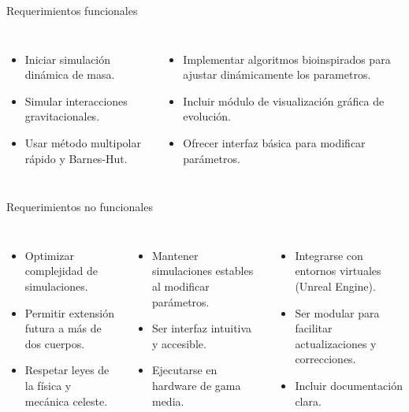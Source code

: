 \begin{frame}{Requerimientos funcionales}
  \begin{columns}[T]
      \begin{itemize}
        \item Iniciar simulación dinámica de masa.
        \item Simular interacciones gravitacionales.
        \item Usar método multipolar rápido y Barnes-Hut.
      \end{itemize}
      \begin{itemize}
        \item Implementar algoritmos bioinspirados para ajustar dinámicamente los parametros.
        \item Incluir módulo de visualización gráfica de evolución.
        \item Ofrecer interfaz básica para modificar parámetros.
      \end{itemize}
  \end{columns}
\end{frame}

\begin{frame}{Requerimientos no funcionales}
  \begin{columns}[T]
      \begin{itemize}
        \item Optimizar complejidad de simulaciones.
        \item Permitir extensión futura a más de dos cuerpos.
        \item Respetar leyes de la física y mecánica celeste.
      \end{itemize}
      \begin{itemize}
        \item Mantener simulaciones estables al modificar parámetros.
        \item Ser interfaz intuitiva y accesible.
        \item Ejecutarse en hardware de gama media.
      \end{itemize}
      \begin{itemize}
        \item Integrarse con entornos virtuales (Unreal Engine).
        \item Ser modular para facilitar actualizaciones y correcciones.
        \item Incluir documentación clara.
      \end{itemize}
  \end{columns}
\end{frame}

